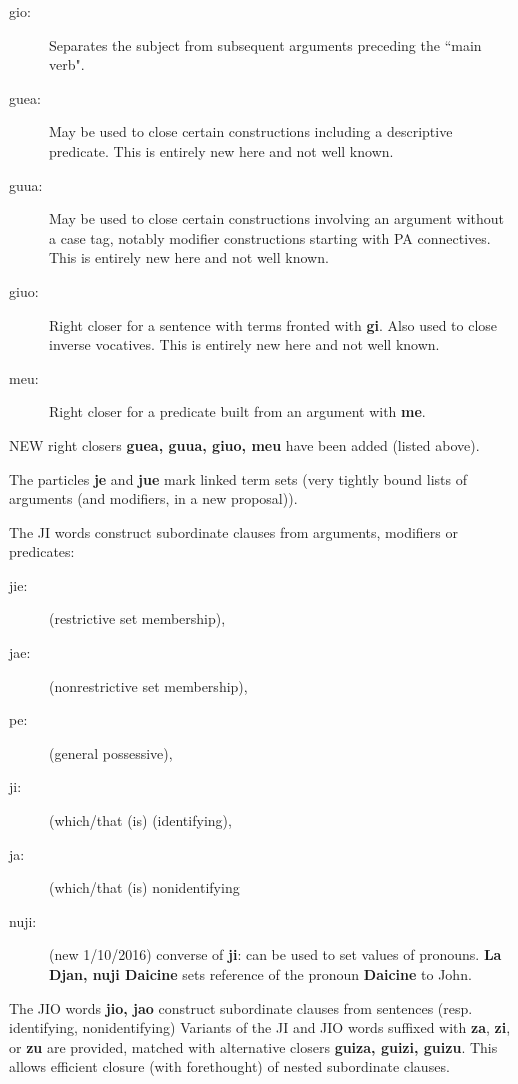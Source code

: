 \documentclass[12pt]{book}
\begin{document}
{\begin{description}
\item[gio:]  Separates the subject from subsequent arguments preceding the ``main verb".

\item[guea:]  May be used to close certain constructions including a descriptive predicate.  This is entirely new here and not well known.

\item[guua:]  May be used to close certain constructions involving an argument without a case tag, notably modifier constructions starting with PA connectives.  This is entirely new here and not well known.

\item[giuo:]  Right closer for a sentence with terms fronted with {\bf gi}.  Also used to close inverse vocatives.  This is entirely new here and not well known.

\item[meu:]  Right closer for a predicate built from an argument with {\bf me}.

\end{description}

NEW right closers {\bf guea, guua, giuo, meu\/} have been added (listed above).

The particles {\bf je} and {\bf jue} mark linked term sets (very tightly bound lists of arguments (and modifiers, in a new proposal)).

The JI words  construct subordinate clauses from arguments,  modifiers or predicates:

\begin{description}
\item[jie:] (restrictive set membership), \item[jae:] (nonrestrictive set membership), \item[pe:] (general possessive), \item[ji:] (which/that (is) (identifying), \item[ja:] (which/that (is) nonidentifying\item[nuji:]  (new 1/10/2016)  converse of {\bf ji}:  can be used to set values of pronouns.  {\bf La Djan, nuji Daicine} sets reference of the pronoun {\bf Daicine} to
John.

\end{description} 

The JIO words {\bf jio, jao} construct subordinate clauses from sentences (resp. identifying, nonidentifying)  Variants of the
JI and JIO words suffixed with {\bf za}, {\bf zi}, or {\bf zu} are provided, matched with alternative closers
{\bf guiza, guizi, guizu}.  This allows efficient closure (with forethought) of nested subordinate clauses.

}
\end{document}
